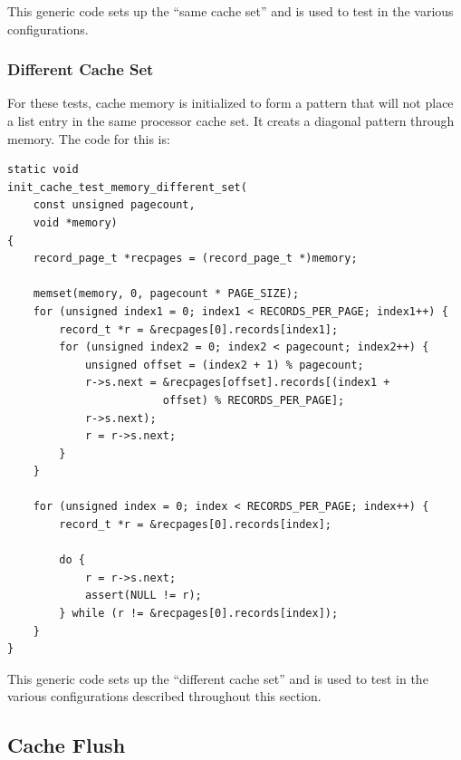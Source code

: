 This generic code sets up the ``same cache set'' and is
used to test in the various configurations.

\subsubsection{Different Cache Set}

For these tests, cache memory is initialized to form a pattern
that will not place a list entry in the same processor cache
set. It creats a diagonal pattern through memory. The code for this is:

\begin{verbatim}
static void 
init_cache_test_memory_different_set(
    const unsigned pagecount, 
    void *memory)
{
    record_page_t *recpages = (record_page_t *)memory;

    memset(memory, 0, pagecount * PAGE_SIZE);
    for (unsigned index1 = 0; index1 < RECORDS_PER_PAGE; index1++) {
        record_t *r = &recpages[0].records[index1];
        for (unsigned index2 = 0; index2 < pagecount; index2++) {
            unsigned offset = (index2 + 1) % pagecount;
            r->s.next = &recpages[offset].records[(index1 + 
                        offset) % RECORDS_PER_PAGE];
            r->s.next);
            r = r->s.next;
        }
    }

    for (unsigned index = 0; index < RECORDS_PER_PAGE; index++) {
        record_t *r = &recpages[0].records[index];

        do {
            r = r->s.next;
            assert(NULL != r);
        } while (r != &recpages[0].records[index]);
    }
}
\end{verbatim}
    
This generic code sets up the ``different cache set'' and is
used to test in the various configurations described throughout this section.

\subsection{Cache Flush}\label{micro:sec:cacheflush}

